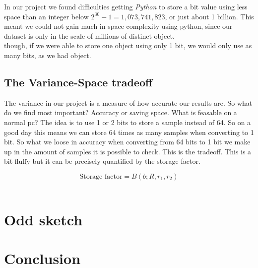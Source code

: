 \documentclass[a4paper,11pt]{article}
\begin{document}
In our project we found difficulties getting \emph{Python} to store a bit value using less space than an integer below $2^{30}-1 = 1,073,741,823$, or just about 1 billion. This meant we could not gain much in space complexity using python, since our dataset is only in the scale of millions of distinct object. \\

though, if we were able to store one object using only 1 bit, we would only use as many bits, as we had object. %


\subsection{The Variance-Space tradeoff}

The variance in our project is a measure of how accurate our results are. So what do we find most important? Accuracy or saving space. What is feasable on a normal pc? The idea is to use 1 or 2 bits to store a sample instead of 64. So on a good day this means we can store 64 times as many samples when converting to 1 bit. So what we loose in accuracy when converting from 64 bits to 1 bit we make up in the amount of samples it is possible to check. This is the tradeoff. This is a bit fluffy but it can be precisely quantified by the storage factor. 

\begin{equation}
    \text {Storage factor} = B(b;R,r_1,r_2)
\end{equation}\\

\section{Odd sketch}

\section{Conclusion}
\newpage

\end{document}
